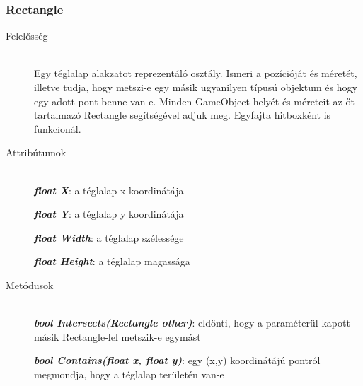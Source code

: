 \subsubsection{Rectangle}
	\begin{description}
		\item[Felelősség] \hfill \\
		Egy téglalap alakzatot reprezentáló osztály. Ismeri a pozícióját és méretét, illetve tudja, hogy metszi-e egy másik ugyanilyen típusú objektum és hogy egy adott pont benne van-e. Minden GameObject helyét és méreteit az őt tartalmazó Rectangle segítségével adjuk meg. Egyfajta hitboxként is funkcionál.
				
		\item[Attribútumok]\hfill \\
		\textbf{\emph{float X}}: a téglalap x koordinátája
		
		\textbf{\emph{float Y}}: a téglalap y koordinátája
		
		\textbf{\emph{float Width}}: a téglalap szélessége
		
		\textbf{\emph{float Height}}: a téglalap magassága
		
		\item[Metódusok]\hfill \\
		\textbf{\emph{bool Intersects(Rectangle other)}}: eldönti, hogy a paraméterül kapott másik Rectangle-lel metszik-e egymást
		
		\textbf{\emph{bool Contains(float x, float y)}}: egy (x,y) koordinátájú pontról megmondja, hogy a téglalap területén van-e
						
	\end{description}

